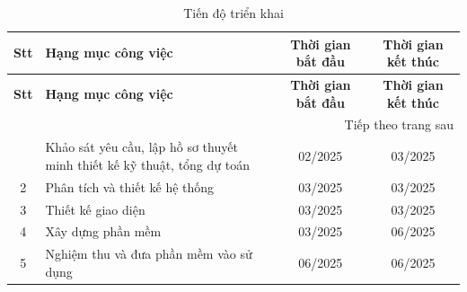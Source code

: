 \begin{longtable}{|c|p{6cm}|c|c|}
\caption{Tiến độ triển khai \label{tab:tien_do}} \\
\hline
\textbf{Stt} & \textbf{Hạng mục công việc} & \textbf{Thời gian bắt đầu} & \textbf{Thời gian kết thúc} \\ \hline
\endfirsthead
\hline
\textbf{Stt} & \textbf{Hạng mục công việc} & \textbf{Thời gian bắt đầu} & \textbf{Thời gian kết thúc} \\ \hline
\endhead
\hline
\multicolumn{4}{r}{{Tiếp theo trang sau}} \\
\endfoot
\hline
\endlastfoot
1 & Khảo sát yêu cầu, lập hồ sơ thuyết minh thiết kế kỹ thuật, tổng dự toán & 02/2025 & 03/2025 \\ \hline
2 & Phân tích và thiết kế hệ thống & 03/2025 & 03/2025 \\ \hline
3 & Thiết kế giao diện & 03/2025 & 03/2025 \\ \hline
4 & Xây dựng phần mềm & 03/2025 & 06/2025 \\ \hline
5 & Nghiệm thu và đưa phần mềm vào sử dụng & 06/2025 & 06/2025 \\ \hline
\end{longtable}